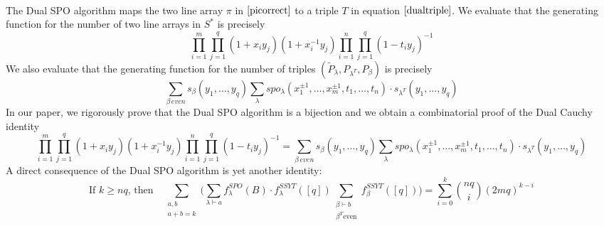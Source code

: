 \documentclass[25pt, a0paper]{tikzposter}
\newcommand{\ds}{\displaystyle}
\begin{document}
{\begin{minipage}[t]{0.45\linewidth}
{		\vspace*{1.5cm}
	}
	\end{minipage}\\
	The Dual SPO algorithm maps the two line array $\pi$ in $\ref{picorrect}$ to a triple $T$ in equation $\ref{dualtriple}$. We evaluate that the generating function for the number of two line arrays in $S^*$ is precisely
	\begin{equation}
	\label{genfS}
	\prod_{i=1}^m \prod_{j=1}^q (1+x_i y_j)(1+x_i^{-1}y_j) \prod_{i=1}^n \prod_{j=1}^q (1-t_iy_j)^{-1}
	\end{equation}
	We also evaluate that the generating function for the number of triples $\ds (\tilde{P}_\lambda, P_{\lambda^T}, P_\beta)$ is precisely
	\begin{equation}
	\label{genftripledual}
	\sum_{\beta \,even} s_\beta(y_1, \dots, y_q) \sum_{\lambda} spo_\lambda(x_1^{\pm 1}, \dots, x_m^{\pm 1}, t_1, \dots, t_n) \cdot s_{\lambda^T}(y_1, \dots, y_q)
	\end{equation}
	 In our paper, we rigorously prove that the Dual SPO algorithm is a bijection and we obtain a combinatorial proof of the Dual Cauchy identity
	 \begin{equation}
	 \prod_{i=1}^m \prod_{j=1}^q (1+x_i y_j)(1+x_i^{-1}y_j) \prod_{i=1}^n \prod_{j=1}^q (1-t_iy_j)^{-1} = \sum_{\beta \,even} s_\beta(y_1, \dots, y_q) \sum_{\lambda} spo_\lambda(x_1^{\pm 1}, \dots, x_m^{\pm 1}, t_1, \dots, t_n) \cdot s_{\lambda^T}(y_1, \dots, y_q)
	 \end{equation}
	 A direct consequence of the Dual SPO algorithm is yet another identity:
	 \begin{equation}
	 \text{If } k \geq nq\text{, then} \quad \sum_{\substack{a, b\\a+b=k}}\Bigg(\sum_{\lambda \vdash a}f_\lambda^{SPO}(B)\cdot f_\lambda^{SSYT}([q]) \sum_{\substack{\beta \vdash b\\\beta^T \text{even}}}f_\beta^{SSYT}([q]) \Bigg) = \sum_{i=0}^k \binom{nq}{i} (2mq)^{k-i}
	 \end{equation}
}
\end{document}
